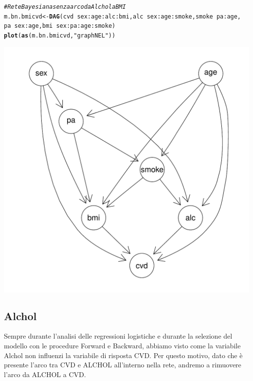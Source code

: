 \documentclass{article}\usepackage[]{graphicx}\usepackage[]{xcolor}
\makeatletter
\def\maxwidth{ %
  \ifdim\Gin@nat@width>\linewidth
    \linewidth
  \else
    \Gin@nat@width
  \fi
}
\newcommand{\hlstr}[1]{\textcolor[rgb]{0.192,0.494,0.8}{#1}}%
\newcommand{\hlcom}[1]{\textcolor[rgb]{0.678,0.584,0.686}{\textit{#1}}}%
\newcommand{\hlopt}[1]{\textcolor[rgb]{0,0,0}{#1}}%
\newcommand{\hlstd}[1]{\textcolor[rgb]{0.345,0.345,0.345}{#1}}%
\newcommand{\hlkwb}[1]{\textcolor[rgb]{0.69,0.353,0.396}{#1}}%
\newcommand{\hlkwd}[1]{\textcolor[rgb]{0.737,0.353,0.396}{\textbf{#1}}}%
\newenvironment{kframe}{%
 \def\at@end@of@kframe{}%
 \ifinner\ifhmode%
  \def\at@end@of@kframe{\end{minipage}}%
  \begin{minipage}{\columnwidth}%
 \fi\fi%
 \def\FrameCommand##1{\hskip\@totalleftmargin \hskip-\fboxsep
 \colorbox{shadecolor}{##1}\hskip-\fboxsep
     \hskip-\linewidth \hskip-\@totalleftmargin \hskip\columnwidth}%
 \MakeFramed {\advance\hsize-\width
   \@totalleftmargin\z@ \linewidth\hsize
   \@setminipage}}%
 {\par\unskip\endMakeFramed%
 \at@end@of@kframe}
\newenvironment{knitrout}{}{} %
\makeatother
\begin{document}
\begin{knitrout}
\color{fgcolor}\begin{kframe}
\begin{alltt}
\hlcom{#Rete Bayesiana senza arco da Alchol a BMI}
\hlstd{m.bn.bmicvd} \hlkwb{<-} \hlkwd{DAG}\hlstd{(cvd}\hlopt{~}\hlstd{sex}\hlopt{:}\hlstd{age}\hlopt{:}\hlstd{alc}\hlopt{:}\hlstd{bmi, alc}\hlopt{~}\hlstd{sex}\hlopt{:}\hlstd{age}\hlopt{:}\hlstd{smoke, smoke}\hlopt{~}\hlstd{pa}\hlopt{:}\hlstd{age,}
                   \hlstd{pa}\hlopt{~}\hlstd{sex}\hlopt{:}\hlstd{age, bmi}\hlopt{~}\hlstd{sex}\hlopt{:}\hlstd{pa}\hlopt{:}\hlstd{age}\hlopt{:}\hlstd{smoke)}
\hlkwd{plot}\hlstd{(}\hlkwd{as}\hlstd{(m.bn.bmicvd,} \hlstr{"graphNEL"}\hlstd{))}
\end{alltt}
\end{kframe}
\includegraphics[width=\maxwidth]{figure/Rete_Bayesiana_senza_arco_tra_Alchol_e_BMI-1} 
\end{knitrout}
    
    
  \subsection{Alchol}
    Sempre durante l'analisi delle regressioni logistiche e durante la selezione
    del modello con le procedure Forward e Backward, abbiamo visto come
    la variabile Alchol non influenzi la variabile di risposta CVD. Per questo
    motivo, dato che è presente l'arco tra CVD e ALCHOL all'interno nella rete,
    andremo a rimuovere l'arco da ALCHOL a CVD.
    
\end{document}
